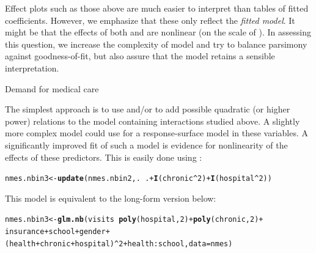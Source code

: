 \documentclass[11pt]{book}\usepackage[]{graphicx}\usepackage[]{color}
\makeatletter
\newcommand{\hlnum}[1]{\textcolor[rgb]{0.686,0.059,0.569}{#1}}%
\newcommand{\hlopt}[1]{\textcolor[rgb]{0,0,0}{#1}}%
\newcommand{\hlstd}[1]{\textcolor[rgb]{0.345,0.345,0.345}{#1}}%
\newcommand{\hlkwb}[1]{\textcolor[rgb]{0.69,0.353,0.396}{#1}}%
\newcommand{\hlkwc}[1]{\textcolor[rgb]{0.333,0.667,0.333}{#1}}%
\newcommand{\hlkwd}[1]{\textcolor[rgb]{0.737,0.353,0.396}{\textbf{#1}}}%
\newenvironment{kframe}{%
 \def\at@end@of@kframe{}%
 \ifinner\ifhmode%
  \def\at@end@of@kframe{\end{minipage}}%
  \begin{minipage}{\columnwidth}%
 \fi\fi%
 \def\FrameCommand##1{\hskip\@totalleftmargin \hskip-\fboxsep
 \colorbox{shadecolor}{##1}\hskip-\fboxsep
     \hskip-\linewidth \hskip-\@totalleftmargin \hskip\columnwidth}%
 \MakeFramed {\advance\hsize-\width
   \@totalleftmargin\z@ \linewidth\hsize
   \@setminipage}}%
 {\par\unskip\endMakeFramed%
 \at@end@of@kframe}
\newenvironment{knitrout}{}{} %
\renewenvironment{knitrout}{\small\renewcommand{\baselinestretch}{.85}}{} %
\makeatother
\begin{document}
Effect plots such as those above are much easier to interpret than
tables of fitted coefficients. However, we emphasize that these only
reflect the \emph{fitted model}. It might be that the effects of both
 and  are nonlinear (on the scale of
).
In assessing this question, we increase the complexity of model
and try to balance parsimony against goodness-of-fit, but also assure
that the model retains a sensible interpretation.

\begin{Example}[nmes3]{Demand for medical care}

The simplest approach is to use
 and/or  to add
possible quadratic (or higher power) relations to the model  
containing interactions studied above.
A slightly more
complex model could use 
for a response-surface model in these variables.
A significantly improved fit of such a model is evidence for nonlinearity of the effects
of these predictors.  This is easily done using :
\begin{knitrout}
\color{fgcolor}\begin{kframe}
\begin{alltt}
\hlstd{nmes.nbin3} \hlkwb{<-} \hlkwd{update}\hlstd{(nmes.nbin2, .} \hlopt{~} \hlstd{.} \hlopt{+} \hlkwd{I}\hlstd{(chronic}\hlopt{^}\hlnum{2}\hlstd{)} \hlopt{+} \hlkwd{I}\hlstd{(hospital}\hlopt{^}\hlnum{2}\hlstd{))}
\end{alltt}
\end{kframe}
\end{knitrout}
\noindent This model is equivalent to the long-form version below:
\begin{knitrout}
\color{fgcolor}\begin{kframe}
\begin{alltt}
\hlstd{nmes.nbin3} \hlkwb{<-} \hlkwd{glm.nb}\hlstd{(visits} \hlopt{~} \hlkwd{poly}\hlstd{(hospital,}\hlnum{2}\hlstd{)} \hlopt{+} \hlkwd{poly}\hlstd{(chronic,}\hlnum{2}\hlstd{)} \hlopt{+}
                     \hlstd{insurance} \hlopt{+} \hlstd{school} \hlopt{+} \hlstd{gender} \hlopt{+}
                     \hlstd{(health}\hlopt{+}\hlstd{chronic}\hlopt{+}\hlstd{hospital)}\hlopt{^}\hlnum{2} \hlopt{+} \hlstd{health}\hlopt{:}\hlstd{school,} \hlkwc{data} \hlstd{= nmes)}
\end{alltt}
\end{kframe}

\end{knitrout}
\end{Example}
\end{document}
